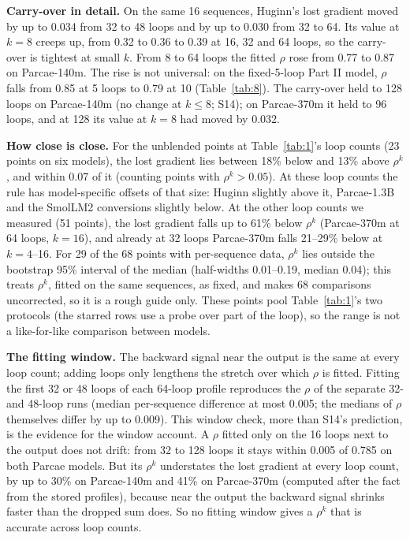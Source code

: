 \documentclass[10pt]{article}
\begin{document}
\textbf{Carry-over in detail.} On the same 16 sequences, Huginn's lost gradient moved by up to 0.034 from 32 to 48 loops and by up to 0.030 from 32 to 64. Its value at $k = 8$ creeps up, from 0.32 to 0.36 to 0.39 at 16, 32 and 64 loops, so the carry-over is tightest at small $k$. From 8 to 64 loops the fitted $\rho$ rose from 0.77 to 0.87 on Parcae-140m. The rise is not universal: on the fixed-5-loop Part II model, $\rho$ falls from 0.85 at 5 loops to 0.79 at 10 (Table~\ref{tab:8}). The carry-over held to 128 loops on Parcae-140m (no change at $k \leq  8$; S14); on Parcae-370m it held to 96 loops, and at 128 its value at $k = 8$ had moved by 0.032.

\textbf{How close is close.} For the unblended points at Table~\ref{tab:1}'s loop counts (23 points on six models), the lost gradient lies between 18\% below and 13\% above $\rho^{k}$, and within 0.07 of it (counting points with $\rho^{k} > 0.05$). At these loop counts the rule has model-specific offsets of that size: Huginn slightly above it, Parcae-1.3B and the SmolLM2 conversions slightly below. At the other loop counts we measured (51 points), the lost gradient falls up to 61\% below $\rho^{k}$ (Parcae-370m at 64 loops, $k = 16$), and already at 32 loops Parcae-370m falls 21--29\% below at $k = 4$--16. For 29 of the 68 points with per-sequence data, $\rho^{k}$ lies outside the bootstrap 95\% interval of the median (half-widths 0.01--0.19, median 0.04); this treats $\rho^{k}$, fitted on the same sequences, as fixed, and makes 68 comparisons uncorrected, so it is a rough guide only. These points pool Table~\ref{tab:1}'s two protocols (the starred rows use a probe over part of the loop), so the range is not a like-for-like comparison between models.

\textbf{The fitting window.} The backward signal near the output is the same at every loop count; adding loops only lengthens the stretch over which $\rho$ is fitted. Fitting the first 32 or 48 loops of each 64-loop profile reproduces the $\rho$ of the separate 32- and 48-loop runs (median per-sequence difference at most 0.005; the medians of $\rho$ themselves differ by up to 0.009). This window check, more than S14's prediction, is the evidence for the window account. A $\rho$ fitted only on the 16 loops next to the output does not drift: from 32 to 128 loops it stays within 0.005 of 0.785 on both Parcae models. But its $\rho^{k}$ understates the lost gradient at every loop count, by up to 30\% on Parcae-140m and 41\% on Parcae-370m (computed after the fact from the stored profiles), because near the output the backward signal shrinks faster than the dropped sum does. So no fitting window gives a $\rho^{k}$ that is accurate across loop counts.
\end{document}
